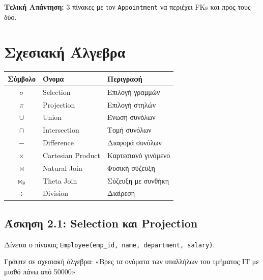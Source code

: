 \textbf{Τελική Απάντηση:} 3 πίνακες με τον \texttt{Appointment} να περιέχει FKs και
προς τους δύο.


\section{Σχεσιακή Άλγεβρα}

\begin{infobox}
\begin{center}
\begin{tabular}{cll}
\toprule
\textbf{Σύμβολο} & \textbf{Όνομα} & \textbf{Περιγραφή} \\
\midrule
$\sigma$ & Selection & Επιλογή γραμμών \\
$\pi$ & Projection & Επιλογή στηλών \\
$\cup$ & Union & Ένωση συνόλων \\
$\cap$ & Intersection & Τομή συνόλων \\
$-$ & Difference & Διαφορά συνόλων \\
$\times$ & Cartesian Product & Καρτεσιανό γινόμενο \\
$\bowtie$ & Natural Join & Φυσική σύζευξη \\
$\bowtie_\theta$ & Theta Join & Σύζευξη με συνθήκη \\
$\div$ & Division & Διαίρεση \\
\bottomrule
\end{tabular}
\end{center}
\end{infobox}

\subsection{Άσκηση 2.1: Selection και Projection}

\begin{formulabox}[Εκφώνηση]
Δίνεται ο πίνακας \texttt{Employee(emp\_id, name, department, salary)}.

Γράψτε σε σχεσιακή άλγεβρα: «Βρες τα ονόματα των υπαλλήλων του τμήματος IT με
μισθό πάνω από 50000».
\end{formulabox}

